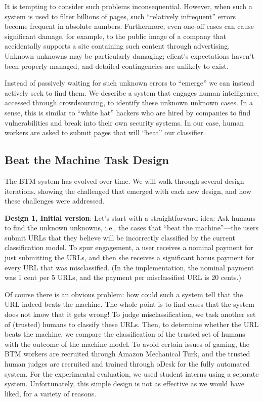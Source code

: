 
It is tempting to consider such problems inconsequential. However, when such a system is used to filter billions of pages, such ``relatively infrequent'' errors become frequent in absolute numbers. Furthermore, even one-off cases can cause significant damage, for example, to the public image of a company that accidentally supports a site containing such content through advertising. Unknown unknowns may be particularly damaging; client's expectations haven't been properly managed, and detailed contingencies are unlikely to exist. 

Instead of passively waiting for such unknown errors to ``emerge'' we can instead actively seek to find them. We describe a system that engages human intelligence, accessed through crowdsourcing, to identify these unknown unknown cases. In a sense, this is similar to ``white hat'' hackers who are hired by companies to find vulnerabilities and break into their own security systems. In our case, human workers are asked to submit pages that will ``beat'' our classifier.

\subsection{Beat the Machine Task Design}

The BTM system has evolved over time. We will walk through several design iterations, showing the challenged that emerged with each new design, and how these challenges were addressed. 

\textbf{Design 1, Initial version}: Let's start with a straightforward idea: Ask humans to find the unknown unknowns, i.e., the cases that ``beat the machine''---the users  submit URLs that they believe will be incorrectly classified by the current classification model.  To spur engagement, a user receives a nominal payment for just submitting the URLs, and then she receives a significant bonus payment for every URL that was misclassified. (In the implementation, the nominal payment was 1 cent per 5 URLs, and the payment per misclassified URL is 20 cents.)  

Of course there is an obvious problem: how could such a system tell that the URL indeed beats the machine.  The whole point is to find cases that the system does not know that it gets wrong!   To judge misclassification, we task another set of (trusted) humans to classify these URLs.  Then, to determine whether the URL beats the machine, we compare the classification of the trusted set of humans with the outcome of the machine model. To avoid certain issues of gaming, the BTM workers are recruited through Amazon Mechanical Turk, and the trusted human judges are recruited and trained through oDesk for the fully automated system. For the experimental evaluation, we used student interns using a separate system.  Unfortunately, this simple design is not as effective as we would have liked, for a variety of reasons.

